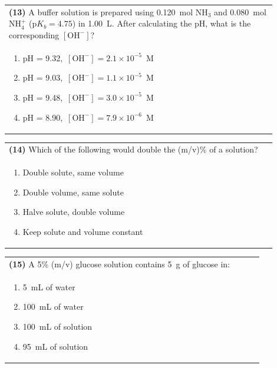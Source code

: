 \documentclass{article}
\begin{document}
\noindent\begin{tabular}{|p{0.9\linewidth}|}
\hline
\textbf{(13)} A buffer solution is prepared using 0.120~mol NH$_3$ and 0.080~mol NH$_4^+$ (p$K_b=4.75$) in 1.00~L. After calculating the pH, what is the corresponding $[\mathrm{OH^-}]$?\\[0.2cm]
\begin{minipage}[t]{0.85\linewidth}
\begin{enumerate}[label=\alph*.]
\item pH = 9.32,\ $[\mathrm{OH^-}] = 2.1\times10^{-5}$~M
\item pH = 9.03,\ $[\mathrm{OH^-}] = 1.1\times10^{-5}$~M
\item pH = 9.48,\ $[\mathrm{OH^-}] = 3.0\times10^{-5}$~M
\item pH = 8.90,\ $[\mathrm{OH^-}] = 7.9\times10^{-6}$~M
\end{enumerate}
\end{minipage}\\[0.2cm]
\hline
\end{tabular}

\noindent\begin{tabular}{|p{0.9\linewidth}|}
\hline
\textbf{(14)} Which of the following would double the (m/v)\% of a solution?\\[0.2cm]
\begin{minipage}[t]{0.85\linewidth}
\begin{enumerate}[label=\alph*.]
\item Double solute, same volume
\item Double volume, same solute
\item Halve solute, double volume
\item Keep solute and volume constant
\end{enumerate}
\end{minipage}\\[0.2cm]
\hline
\end{tabular}

\noindent\begin{tabular}{|p{0.9\linewidth}|}
\hline
\textbf{(15)} A 5\% (m/v) glucose solution contains 5~g of glucose in:\\[0.2cm]
\begin{minipage}[t]{0.85\linewidth}
\begin{enumerate}[label=\alph*.]
\item 5~mL of water
\item 100~mL of water
\item 100~mL of solution
\item 95~mL of solution
\end{enumerate}
\end{minipage}\\[0.2cm]
\hline
\end{tabular}
\end{document}
